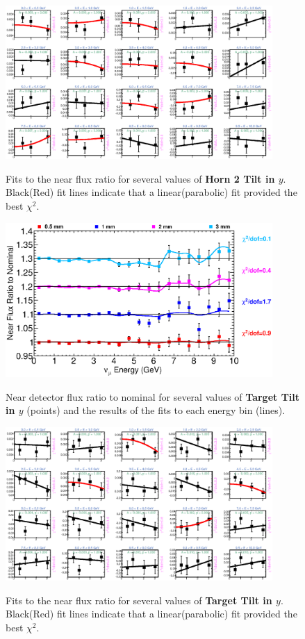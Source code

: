 \begin{figure}[hb]
  \begin{center}
    {\includegraphics[width=4.0in]{figures/Horn2YTilt_near_fits.eps}}
  \end{center}
\caption{ Fits to the near flux ratio for several values of {\bf Horn 2 Tilt in $y$}. Black(Red) fit lines indicate that a linear(parabolic) fit provided the best $\chi^2$. }
\end{figure}

\clearpage

\begin{figure}[ht]
  \begin{center}
    {\includegraphics[width=4.0in]{figures/TargetYTilt_near_summary.eps}}
  \end{center}
\caption{ Near detector flux ratio to nominal for several values of {\bf Target Tilt in $y$} (points) and the results of the fits to each energy bin (lines).}
\end{figure}

\begin{figure}[hb]
  \begin{center}
    {\includegraphics[width=4.0in]{figures/TargetYTilt_near_fits.eps}}
  \end{center}
\caption{ Fits to the near flux ratio for several values of {\bf Target Tilt in $y$}. Black(Red) fit lines indicate that a linear(parabolic) fit provided the best $\chi^2$. }
\end{figure}

